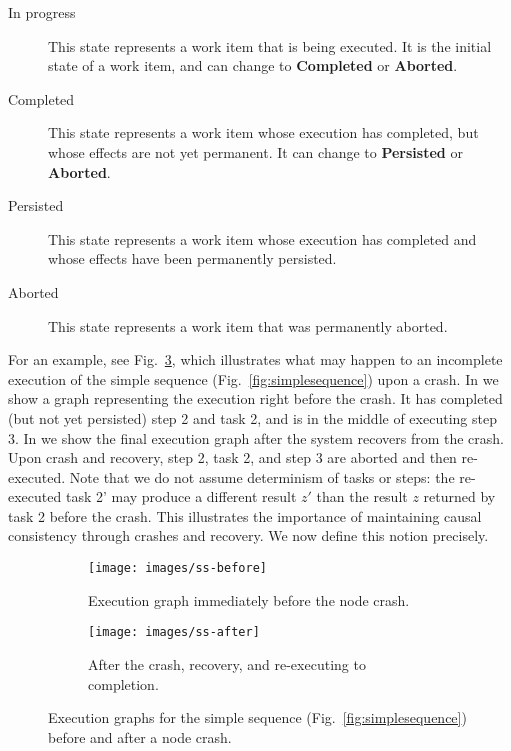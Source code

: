 \begin{description}
\item[In progress] This state represents a work item that is being executed. It is the initial state of a work item, and can change to \textbf{Completed} or \textbf{Aborted}.
\item[Completed] This state represents a work item whose execution has completed, but whose effects are not yet permanent. It can change to \textbf{Persisted} or \textbf{Aborted}.
\item[Persisted] This state represents a work item whose execution has completed and whose effects have been permanently persisted.
\item[Aborted] This state represents a work item that was permanently aborted. 
\end{description}

For an example, see Fig.~\ref{fig:failure-execution}, which illustrates what may happen to an incomplete execution of the simple sequence (Fig.~\ref{fig:simplesequence}) upon a crash. In  we show a graph representing the execution right before the crash. It has completed (but not yet persisted) step 2 and task 2, and is in the middle of executing step 3. In  we show the final execution graph after the system recovers from the crash. Upon crash and recovery, step 2, task 2, and step 3 are aborted and then re-executed. Note that we do not assume determinism of tasks or steps: the re-executed task 2' may produce a different result $z'$ than the result $z$ returned by task 2 before the crash. This illustrates the importance of maintaining causal consistency through crashes and recovery. We now define this notion precisely.
 

\begin{figure}
    \centering
    \begin{subfigure}[b]{\columnwidth}
        \centering
        \texttt{[image: images/ss-before]}
        \caption{Execution graph immediately before the node crash.}
        \label{fig:pre-failure-execution}
    \end{subfigure}
    \begin{subfigure}[b]{\columnwidth}
        \centering
        \vspace{.2in}
        \texttt{[image: images/ss-after]}
        \caption{After the crash, recovery, and re-executing to completion.}
        \label{fig:post-failure-execution}
    \end{subfigure}
    \caption{Execution graphs for the simple sequence (Fig.~\ref{fig:simplesequence}) before and after a node crash.
    }
    \label{fig:failure-execution}
\end{figure}

